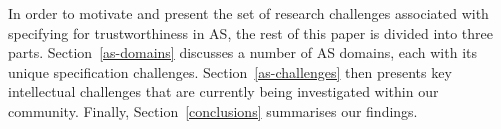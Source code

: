 \documentclass[sigconf,nonacm]{acmart}%
\begin{document}
%	
	In order to motivate and present the set of research challenges associated with specifying for trustworthiness in AS, the rest of this paper is divided into three parts. Section~\ref{as-domains} discusses a number of AS domains, each with its unique specification challenges. Section~\ref{as-challenges} then presents key intellectual challenges that are currently being investigated within our community. Finally, Section~\ref{conclusions} summarises our findings.
\end{document}

